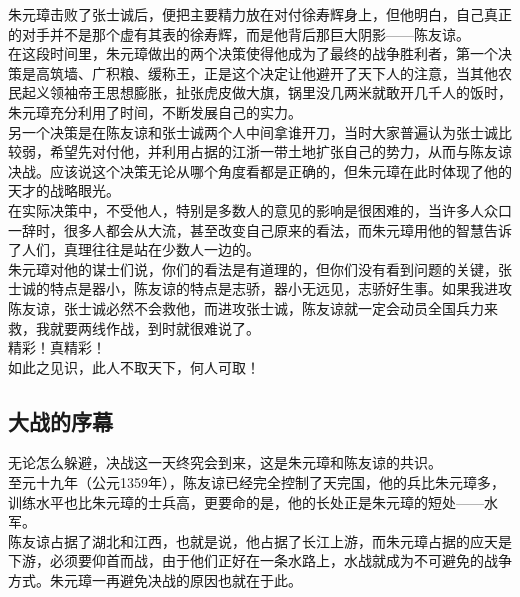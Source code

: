 	\begin{multicols}{\theparacolNo}
\fi
朱元璋击败了张士诚后，便把主要精力放在对付徐寿辉身上，但他明白，自己真正的对手并不是那个虚有其表的徐寿辉，而是他背后那巨大阴影——陈友谅。\\

在这段时间里，朱元璋做出的两个决策使得他成为了最终的战争胜利者，第一个决策是高筑墙、广积粮、缓称王，正是这个决定让他避开了天下人的注意，当其他农民起义领袖帝王思想膨胀，扯张虎皮做大旗，锅里没几两米就敢开几千人的饭时，朱元璋充分利用了时间，不断发展自己的实力。\\

另一个决策是在陈友谅和张士诚两个人中间拿谁开刀，当时大家普遍认为张士诚比较弱，希望先对付他，并利用占据的江浙一带土地扩张自己的势力，从而与陈友谅决战。应该说这个决策无论从哪个角度看都是正确的，但朱元璋在此时体现了他的天才的战略眼光。\\

在实际决策中，不受他人，特别是多数人的意见的影响是很困难的，当许多人众口一辞时，很多人都会从大流，甚至改变自己原来的看法，而朱元璋用他的智慧告诉了人们，真理往往是站在少数人一边的。\\

朱元璋对他的谋士们说，你们的看法是有道理的，但你们没有看到问题的关键，张士诚的特点是器小，陈友谅的特点是志骄，器小无远见，志骄好生事。如果我进攻陈友谅，张士诚必然不会救他，而进攻张士诚，陈友谅就一定会动员全国兵力来救，我就要两线作战，到时就很难说了。\\

精彩！真精彩！\\

如此之见识，此人不取天下，何人可取！\\

\subsection{大战的序幕}
无论怎么躲避，决战这一天终究会到来，这是朱元璋和陈友谅的共识。\\

至元十九年（公元1359年），陈友谅已经完全控制了天完国，他的兵比朱元璋多，训练水平也比朱元璋的士兵高，更要命的是，他的长处正是朱元璋的短处——水军。\\

陈友谅占据了湖北和江西，也就是说，他占据了长江上游，而朱元璋占据的应天是下游，必须要仰首而战，由于他们正好在一条水路上，水战就成为不可避免的战争方式。朱元璋一再避免决战的原因也就在于此。\\


\end{multicols}

